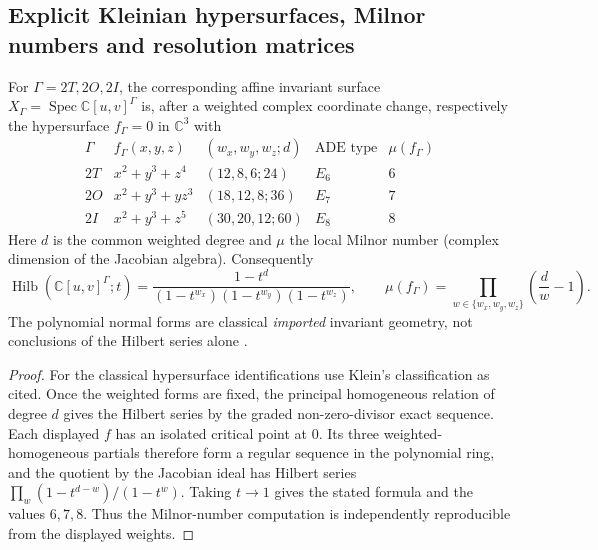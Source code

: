 \documentclass[11pt]{article}
\begin{document}
\subsection{Explicit Kleinian hypersurfaces, Milnor numbers and resolution matrices}
\label{p1b:subsec:v12-kleinian}

\begin{theorem}
\label{p1b:thm:v12-kleinian-normalforms}
For $\Gamma=2T,2O,2I$, the corresponding affine invariant surface
$X_\Gamma=\operatorname{Spec}\mathbb C[u,v]^\Gamma$ is, after a
weighted complex coordinate change, respectively the hypersurface
$f_\Gamma=0$ in $\mathbb C^3$ with
\[
\begin{array}{c|c|c|c|c}
\Gamma&f_\Gamma(x,y,z)&(w_x,w_y,w_z;d)&
\text{ADE type}&\mu(f_\Gamma)\\ \hline
2T&x^2+y^3+z^4&(12,8,6;24)&E_6&6\\
2O&x^2+y^3+yz^3&(18,12,8;36)&E_7&7\\
2I&x^2+y^3+z^5&(30,20,12;60)&E_8&8
\end{array}
\]
Here $d$ is the common weighted degree and $\mu$ the local Milnor
number (complex dimension of the Jacobian algebra).  Consequently
\[
\operatorname{Hilb}(\mathbb C[u,v]^\Gamma;t)
=\frac{1-t^d}{(1-t^{w_x})(1-t^{w_y})(1-t^{w_z})},
\qquad
\mu(f_\Gamma)=\prod_{w\in\{w_x,w_y,w_z\}}
\left(\frac d w-1\right).
\]
The polynomial normal forms are classical \emph{imported} invariant
geometry, not conclusions of the Hilbert series alone
\cite{Klein1884,Slodowy1980,BertschGyengeSzendroi2024Kleinian}.
\end{theorem}
\begin{proof}
For the classical hypersurface identifications use Klein's
classification as cited.  Once the weighted forms are fixed, the
principal homogeneous relation of degree $d$ gives the Hilbert series
by the graded non-zero-divisor exact sequence.  Each displayed $f$
has an isolated critical point at $0$.  Its three weighted-homogeneous
partials therefore form a regular sequence in the polynomial ring,
and the quotient by the Jacobian ideal has Hilbert series
$\prod_w(1-t^{d-w})/(1-t^w)$.  Taking $t\to1$ gives the stated
formula and the values $6,7,8$.  Thus the Milnor-number computation
is independently reproducible from the displayed weights.
\end{proof}
\end{document}
